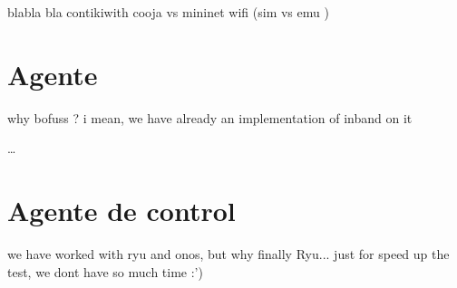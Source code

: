 blabla bla contikiwith cooja vs mininet wifi (sim vs emu )

\section{Agente }
\label{sec:ana_switch}

why bofuss ? i mean, we have already an implementation of inband on it

\dots

\section{Agente de control }
\label{sec:ana_controller}

we have worked with ryu and onos, but why finally Ryu... just for speed up the test, we dont have so much time :')







